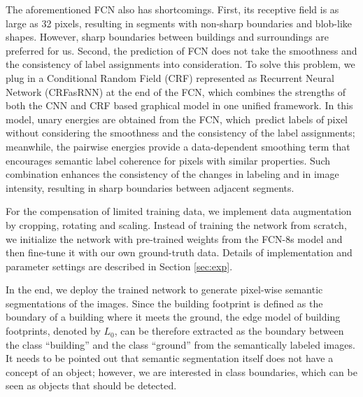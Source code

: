 \documentclass[remotesensing,article,accept,moreauthors,pdftex,10pt,a4paper]{mdpi}
\theoremstyle{mdpi}
\newcounter{ex}
\newcounter{re}
\begin{document}
The aforementioned FCN also has shortcomings. First, its receptive field is as large as 32 pixels, resulting in segments with non-sharp boundaries and blob-like shapes. However, sharp boundaries between buildings and surroundings are preferred for us. Second, the prediction of FCN does not take the smoothness and the consistency of label assignments into consideration. To solve this problem, we plug in a Conditional Random Field (CRF) represented as Recurrent Neural Network (CRFasRNN) \cite{crfasrnn_ICCV2015,higherordercrf_ECCV2016} at the end of the FCN, which combines the strengths of both the CNN and CRF based graphical model in one unified framework. In this model, unary energies are obtained from the FCN, which~predict labels of pixel without considering the smoothness and the consistency of the label assignments; meanwhile, the pairwise energies provide a data-dependent smoothing term that encourages semantic label coherence for pixels with similar properties. Such combination enhances the consistency of the changes in labeling and in image intensity, resulting in sharp boundaries between adjacent segments.

For the compensation of limited training data, we implement data augmentation by cropping, rotating and scaling. Instead of training the network from scratch, we initialize the network with pre-trained weights from the FCN-8s model and then fine-tune it with our own ground-truth data. Details of implementation and parameter settings are described in Section \ref{sec:exp}. 

In the end, we deploy the trained network to generate pixel-wise semantic segmentations of the images. Since the building footprint is defined as the boundary of a building where it meets the ground, the edge model of building footprints, denoted by $L_0$, can be therefore extracted as the boundary between the class ``building'' and the class ``ground'' from the semantically labeled images. It needs to be pointed out that semantic segmentation itself does not have a concept of an object; however, we are interested in class boundaries, which can be seen as objects that should be detected.
\end{document}
